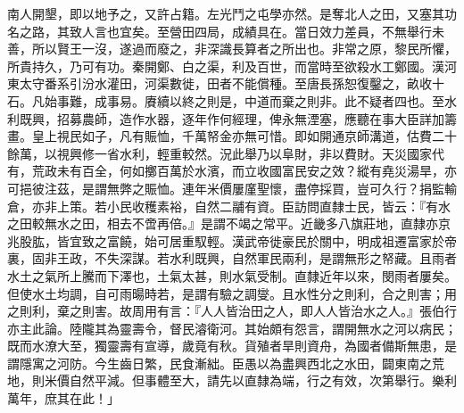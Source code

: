\begin{pinyinscope}
南人開墾，即以地予之，又許占籍。左光鬥之屯學亦然。是奪北人之田，又塞其功名之路，其致人言也宜矣。至營田四局，成績具在。當日效力差員，不無舉行未善，所以賢王一沒，遂過而廢之，非深識長算者之所出也。非常之原，黎民所懼，所貴持久，乃可有功。秦開鄭、白之渠，利及百世，而當時至欲殺水工鄭國。漢河東太守番系引汾水灌田，河渠數徙，田者不能償種。至唐長孫恕復鑿之，畝收十石。凡始事難，成事易。賡續以終之則是，中道而棄之則非。此不疑者四也。至水利既興，招募農師，造作水器，逐年作何經理，俾永無湮塞，應聽在事大臣詳加籌畫。皇上視民如子，凡有賑恤，千萬帑金亦無可惜。即如開通京師溝道，估費二十餘萬，以視興修一省水利，輕重較然。況此舉乃以阜財，非以費財。天災國家代有，荒政未有百全，何如擲百萬於水濱，而立收國富民安之效？縱有堯災湯旱，亦可挹彼注茲，是謂無弊之賑恤。連年米價屢廑聖懷，盡停採買，豈可久行？捐監輸倉，亦非上策。若小民收穫素裕，自然二鬴有資。臣訪問直隸士民，皆云：『有水之田較無水之田，相去不啻再倍。』是謂不竭之常平。近畿多八旗莊地，直隸亦京兆股肱，皆宜致之富饒，始可居重馭輕。漢武帝徙豪民於關中，明成祖遷富家於帝裏，固非王政，不失深謀。若水利既興，自然軍民兩利，是謂無形之帑藏。且雨者水土之氣所上騰而下澤也，土氣太甚，則水氣受制。直隸近年以來，閔雨者屢矣。但使水土均調，自可雨暘時若，是謂有驗之調燮。且水性分之則利，合之則害；用之則利，棄之則害。故周用有言：『人人皆治田之人，即人人皆治水之人。』張伯行亦主此論。陸隴其為靈壽令，督民濬衛河。其始頗有怨言，謂開無水之河以病民；既而水潦大至，獨靈壽有宣導，歲竟有秋。貨殖者旱則資舟，為國者備斯無患，是謂隱寓之河防。今生齒日繁，民食漸絀。臣愚以為盡興西北之水田，闢東南之荒地，則米價自然平減。但事體至大，請先以直隸為端，行之有效，次第舉行。樂利萬年，庶其在此！」


\end{pinyinscope}
